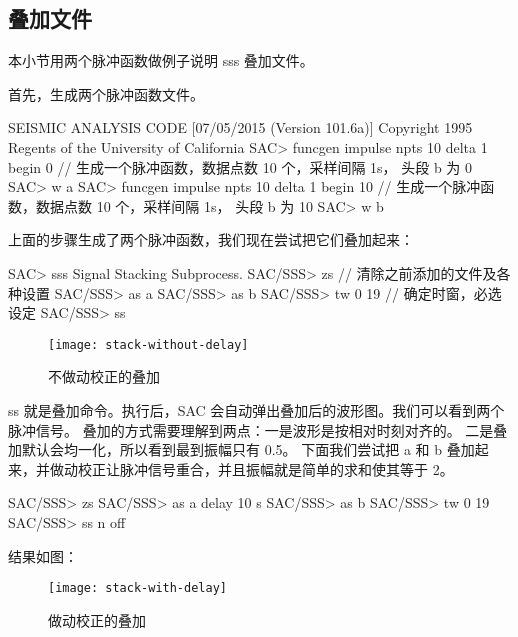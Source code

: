 \subsection{叠加文件}

本小节用两个脉冲函数做例子说明 sss 叠加文件。

首先，生成两个脉冲函数文件。

\begin{SACCode}
SEISMIC ANALYSIS CODE [07/05/2015 (Version 101.6a)]
Copyright 1995 Regents of the University of California
SAC> funcgen impulse npts 10 delta 1 begin 0
// 生成一个脉冲函数，数据点数 10 个，采样间隔 1s， 头段 b 为 0
SAC> w a
SAC> funcgen impulse npts 10 delta 1 begin 10
// 生成一个脉冲函数，数据点数 10 个，采样间隔 1s， 头段 b 为 10
SAC> w b
\end{SACCode}

上面的步骤生成了两个脉冲函数，我们现在尝试把它们叠加起来：

\begin{SACCode}
SAC> sss
 Signal Stacking Subprocess.
SAC/SSS> zs         // 清除之前添加的文件及各种设置
SAC/SSS> as a
SAC/SSS> as b
SAC/SSS> tw 0 19    // 确定时窗，必选设定
SAC/SSS> ss
\end{SACCode}

\begin{figure}[H]
\centering
\texttt{[image: stack-without-delay]}
\caption{不做动校正的叠加}
\label{fig:filter-waveform}
\end{figure}

ss 就是叠加命令。执行后，SAC 会自动弹出叠加后的波形图。我们可以看到两个脉冲信号。
叠加的方式需要理解到两点：一是波形是按相对时刻对齐的。
二是叠加默认会均一化，所以看到最到振幅只有 0.5。
下面我们尝试把 a 和 b 叠加起来，并做动校正让脉冲信号重合，并且振幅就是简单的求和使其等于 2。

\begin{SACCode}
SAC/SSS> zs
SAC/SSS> as a delay 10 s
SAC/SSS> as b
SAC/SSS> tw 0 19
SAC/SSS> ss n off
\end{SACCode}

结果如图：

\begin{figure}[H]
\centering
\texttt{[image: stack-with-delay]}
\caption{做动校正的叠加}
\label{fig:filter-waveform}
\end{figure}
